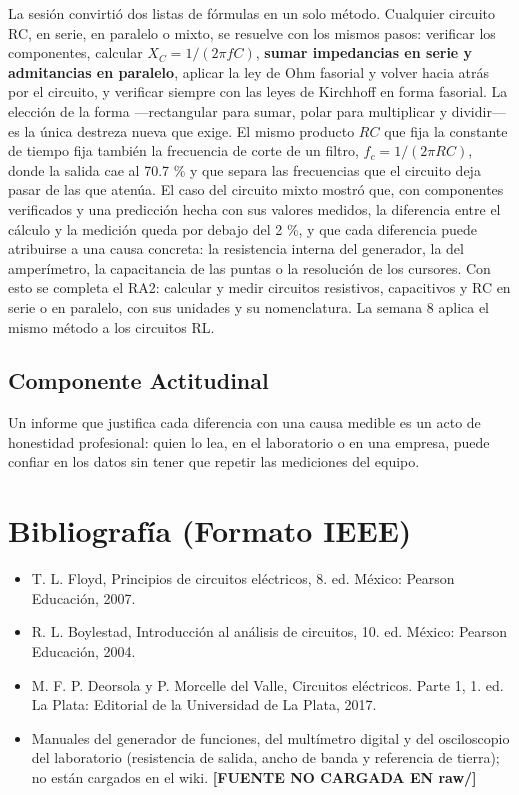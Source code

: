 \documentclass[11pt,letterpaper]{article}
\begin{document}
La sesión convirtió dos listas de fórmulas en un solo método. Cualquier circuito RC, en serie, en paralelo o mixto, se resuelve con los mismos pasos: verificar los componentes, calcular $X_C = 1/(2\pi f C)$, \textbf{sumar impedancias en serie y admitancias en paralelo}, aplicar la ley de Ohm fasorial y volver hacia atrás por el circuito, y verificar siempre con las leyes de Kirchhoff en forma fasorial. La elección de la forma ---rectangular para sumar, polar para multiplicar y dividir--- es la única destreza nueva que exige. El mismo producto $RC$ que fija la constante de tiempo fija también la frecuencia de corte de un filtro, $f_c = 1/(2\pi RC)$, donde la salida cae al 70.7 \% y que separa las frecuencias que el circuito deja pasar de las que atenúa. El caso del circuito mixto mostró que, con componentes verificados y una predicción hecha con sus valores medidos, la diferencia entre el cálculo y la medición queda por debajo del 2 \%, y que cada diferencia puede atribuirse a una causa concreta: la resistencia interna del generador, la del amperímetro, la capacitancia de las puntas o la resolución de los cursores. Con esto se completa el RA2: calcular y medir circuitos resistivos, capacitivos y RC en serie o en paralelo, con sus unidades y su nomenclatura. La semana 8 aplica el mismo método a los circuitos RL.

\subsection*{Componente Actitudinal}

\begin{cita}
Un informe que justifica cada diferencia con una causa medible es un acto de honestidad profesional: quien lo lea, en el laboratorio o en una empresa, puede confiar en los datos sin tener que repetir las mediciones del equipo.
\end{cita}

\section{Bibliografía (Formato IEEE)}

{\sloppy
\begin{itemize}[leftmargin=2.6em, labelwidth=2.2em, labelsep=0.4em, align=left]
  \item[{[1]}] T. L. Floyd, Principios de circuitos eléctricos, 8.\textordfeminine{} ed. México: Pearson Educación, 2007.
  \item[{[2]}] R. L. Boylestad, Introducción al análisis de circuitos, 10.\textordfeminine{} ed. México: Pearson Educación, 2004.
  \item[{[3]}] M. F. P. Deorsola y P. Morcelle del Valle, Circuitos eléctricos. Parte 1, 1.\textordfeminine{} ed. La Plata: Editorial de la Universidad de La Plata, 2017.
  \item[{[4]}] Manuales del generador de funciones, del multímetro digital y del osciloscopio del laboratorio (resistencia de salida, ancho de banda y referencia de tierra); no están cargados en el wiki. \textcolor{iuborange}{\textbf{[FUENTE NO CARGADA EN raw/]}}
\end{itemize}
}
\end{document}
